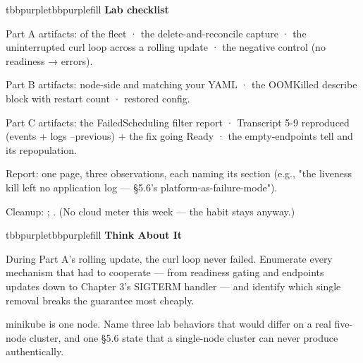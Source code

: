 \begin{calloutbox}{tbbpurple}{tbbpurplefill}
{\normalsize\bfseries\color{tbbpurple}Lab checklist}\par\vspace{3pt}
\begin{tbbitemize}
  \item Part A artifacts:  of the fleet · the delete-and-reconcile capture · the uninterrupted curl loop across a rolling update · the negative control (no readiness → errors).
  \item Part B artifacts: node-side  and  matching your YAML · the OOMKilled describe block with restart count · restored config.
  \item Part C artifacts: the FailedScheduling filter report · Transcript 5-9 reproduced (events + logs --previous) + the fix going Ready · the empty-endpoints tell and its repopulation.
  \item Report: one page, three observations, each naming its section (e.g., "the liveness kill left no application log — §5.6's platform-as-failure-mode").
  \item Cleanup: ; . (No cloud meter this week — the habit stays anyway.)
\end{tbbitemize}
\end{calloutbox}

\vspace{3.0pt}

\begin{calloutbox}{tbbpurple}{tbbpurplefill}
{\normalsize\bfseries\color{tbbpurple}Think About It}\par\vspace{3pt}
\begin{tbbitemize}
  \item During Part A's rolling update, the curl loop never failed. Enumerate every mechanism that had to cooperate — from readiness gating and endpoints updates down to Chapter 3's SIGTERM handler — and identify which single removal breaks the guarantee most cheaply.
  \item minikube is one node. Name three lab behaviors that would differ on a real five-node cluster, and one §5.6 state that a single-node cluster can never produce authentically.
\end{tbbitemize}
\end{calloutbox}


